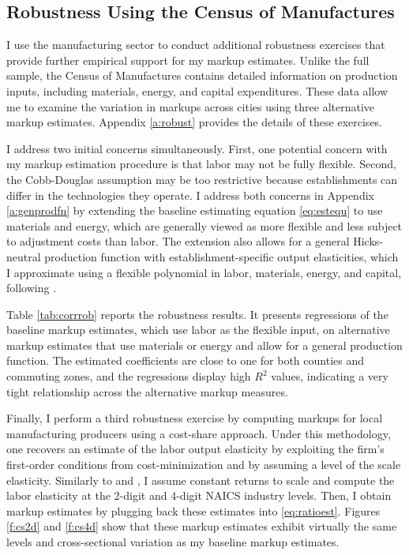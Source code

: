 \subsection{Robustness Using the Census of Manufactures}
I use the manufacturing sector to conduct additional robustness exercises that provide further empirical support for my markup estimates. Unlike the full sample, the Census of Manufactures contains detailed information on production inputs, including materials, energy, and capital expenditures. These data allow me to examine the variation in markups across cities using three alternative markup estimates. Appendix \ref{a:robust} provides the details of these exercises.

I address two initial concerns simultaneously. First, one potential concern with my markup estimation procedure is that labor may not be fully flexible. Second, the Cobb-Douglas assumption may be too restrictive because establishments can differ in the technologies they operate. I address both concerns in Appendix \ref{a:genprodfn} by extending the baseline estimating equation \eqref{eq:estequ} to use materials and energy, which are generally viewed as more flexible and less subject to adjustment costs than labor. The extension also allows for a general Hicks-neutral production function with establishment-specific output elasticities, which I approximate using a flexible polynomial in labor, materials, energy, and capital, following \textcite{GandhiNavarro&Rivers20}.

Table \ref{tab:corrrob} reports the robustness results. It presents regressions of the baseline markup estimates, which use labor as the flexible input, on alternative markup estimates that use materials or energy and allow for a general production function. The estimated coefficients are close to one for both counties and commuting zones, and the regressions display high $R^2$ values, indicating a very tight relationship across the alternative markup measures.

Finally, I perform a third robustness exercise by computing markups for local manufacturing producers using a cost-share approach. Under this methodology, one recovers an estimate of the labor output elasticity by exploiting the firm's first-order conditions from cost-minimization and by assuming a level of the scale elasticity. Similarly to \textcite{DeLoeckerEeckhout&Unger2019} and \textcite{EdmondMidrigan&Xu23}, I assume constant returns to scale and compute the labor elasticity at the 2-digit and 4-digit NAICS industry levels. Then, I obtain markup estimates by plugging back these estimates into \eqref{eq:ratioest}. Figures \ref{f:cs2d} and \ref{f:cs4d} show that these markup estimates exhibit virtually the same levels and cross-sectional variation as my baseline markup estimates.

